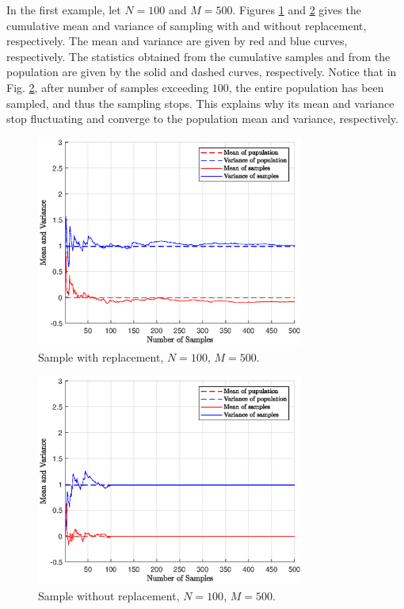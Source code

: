 In the first example, let $N=100$ and $M=500$. Figures \ref{ch:sampling:fig:sample-wr-n100} and \ref{ch:sampling:fig:sample-nwr-n100} gives the cumulative mean and variance of sampling with and without replacement, respectively. The mean and variance are given by red and blue curves, respectively. The statistics obtained from the cumulative samples and from the population are given by the solid and dashed curves, respectively. Notice that in Fig. \ref{ch:sampling:fig:sample-nwr-n100}, after number of samples exceeding $100$, the entire population has been sampled, and thus the sampling stops. This explains why its mean and variance stop fluctuating and converge to the population mean and variance, respectively.

\begin{figure}
	\centering
	\includegraphics[width=250pt]{chapters/ch-sampling/figures/sample-wr-n100.eps}
	\caption{Sample with replacement, $N=100$, $M=500$.} \label{ch:sampling:fig:sample-wr-n100}
\end{figure}

\begin{figure}
	\centering
	\includegraphics[width=250pt]{chapters/ch-sampling/figures/sample-nwr-n100.eps}
	\caption{Sample without replacement, $N=100$, $M=500$.} \label{ch:sampling:fig:sample-nwr-n100}
\end{figure}

